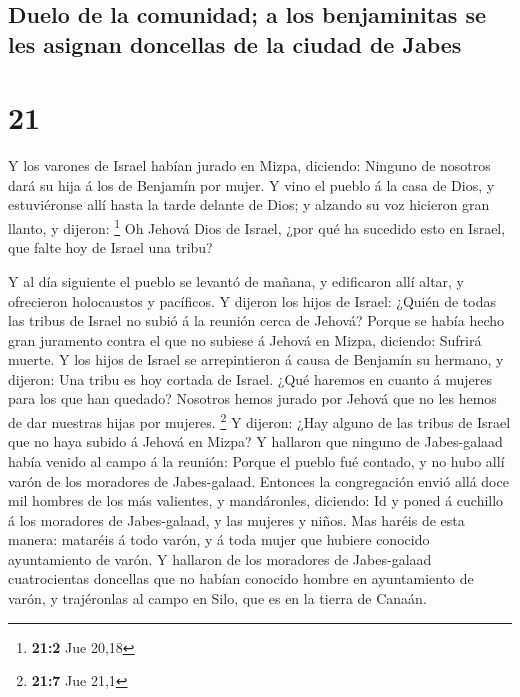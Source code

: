 \hypertarget{duelo-de-la-comunidad-a-los-benjaminitas-se-les-asignan-doncellas-de-la-ciudad-de-jabes}{%
\subsection{Duelo de la comunidad; a los benjaminitas se les asignan
doncellas de la ciudad de
Jabes}\label{duelo-de-la-comunidad-a-los-benjaminitas-se-les-asignan-doncellas-de-la-ciudad-de-jabes}}

\hypertarget{section-20}{%
\section{21}\label{section-20}}

 Y los varones de Israel habían jurado en Mizpa, diciendo:
Ninguno de nosotros dará su hija á los de Benjamín por mujer.
 Y vino el pueblo á la casa de Dios, y estuviéronse allí
hasta la tarde delante de Dios; y alzando su voz hicieron gran llanto, y
dijeron: \footnote{\textbf{21:2} Jue 20,18}  Oh Jehová Dios
de Israel, ¿por qué ha sucedido esto en Israel, que falte hoy de Israel
una tribu?

 Y al día siguiente el pueblo se levantó de mañana, y
edificaron allí altar, y ofrecieron holocaustos y pacíficos.
 Y dijeron los hijos de Israel: ¿Quién de todas las tribus
de Israel no subió á la reunión cerca de Jehová? Porque se había hecho
gran juramento contra el que no subiese á Jehová en Mizpa, diciendo:
Sufrirá muerte.  Y los hijos de Israel se arrepintieron á
causa de Benjamín su hermano, y dijeron: Una tribu es hoy cortada de
Israel.  ¿Qué haremos en cuanto á mujeres para los que han
quedado? Nosotros hemos jurado por Jehová que no les hemos de dar
nuestras hijas por mujeres. \footnote{\textbf{21:7} Jue 21,1}
 Y dijeron: ¿Hay alguno de las tribus de Israel que no haya
subido á Jehová en Mizpa? Y hallaron que ninguno de Jabes-galaad había
venido al campo á la reunión:  Porque el pueblo fué contado,
y no hubo allí varón de los moradores de Jabes-galaad. 
Entonces la congregación envió allá doce mil hombres de los más
valientes, y mandáronles, diciendo: Id y poned á cuchillo á los
moradores de Jabes-galaad, y las mujeres y niños.  Mas
haréis de esta manera: mataréis á todo varón, y á toda mujer que hubiere
conocido ayuntamiento de varón.  Y hallaron de los
moradores de Jabes-galaad cuatrocientas doncellas que no habían conocido
hombre en ayuntamiento de varón, y trajéronlas al campo en Silo, que es
en la tierra de Canaán.

